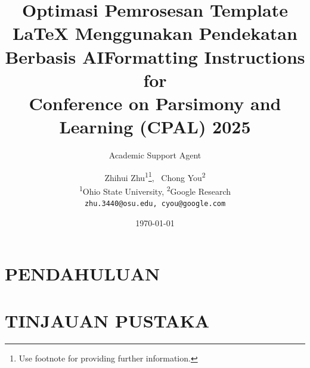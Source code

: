 \documentclass{article}
\title{Optimasi Pemrosesan Template LaTeX Menggunakan Pendekatan Berbasis AI}
\author{Academic Support Agent}
\date{\today}
\begin{document}
\maketitle

\begin{abstract}

\end{abstract}

\chapter{PENDAHULUAN}


\chapter{TINJAUAN PUSTAKA}



\usepackage{cpal_2025}




\usepackage{url}

\title{Formatting Instructions for \\Conference on Parsimony and Learning (CPAL) 2025}


\author{%
  Zhihui Zhu\textsuperscript{1}\thanks{Use footnote for providing further information.}, ~Chong You\textsuperscript{2} \\
  \textsuperscript{1}Ohio State University, \textsuperscript{2}Google Research\\
  \texttt{zhu.3440@osu.edu, cyou@google.com}
}
\end{document}
